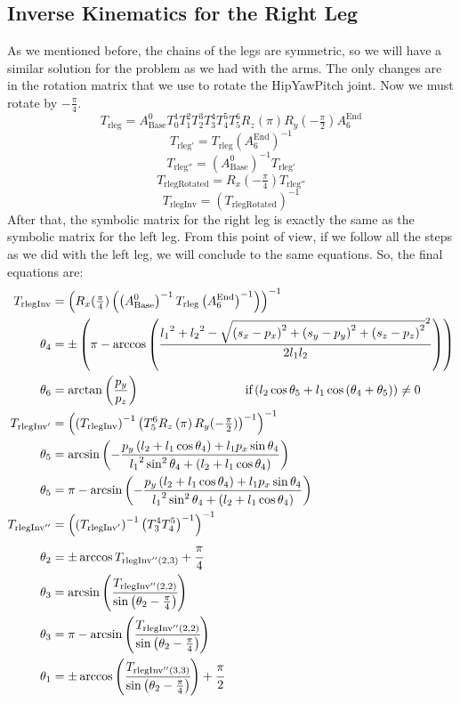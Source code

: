 \subsection{Inverse Kinematics for the Right Leg}
As we mentioned before, the chains of the legs are symmetric, so we will have a similar solution for the problem as we had with the arms. The only changes are in the rotation matrix that we use to rotate the HipYawPitch joint. Now we must rotate by $-\frac{\pi}{4}$.
\[
T_{\text{rleg}} = A^0_\text{Base}T^1_0T^2_1T^3_2T^4_3T^5_4T^6_5R_z(\pi)R_y(-\tfrac{\pi}{2})A^\text{End}_6
\]
\[
T_{\text{rleg}'} = T_\text{rleg}{\left(A^\text{End}_6\right)}^{-1}
\]
\[
T_{\text{rleg}''} = {\left(A^0_\text{Base}\right)}^{-1}T_{\text{rleg}'}
\]
\[
T_\text{rlegRotated} = R_x(-\tfrac{\pi}{4}) T_{\text{rleg}''}
\]
\[
T_\text{rlegInv} = {\left(T_\text{rlegRotated}\right)}^{-1}
\]
After that, the symbolic matrix for the right leg is exactly the same as the symbolic matrix for the left leg. From this point of view, if we follow all the steps as we did with the left leg, we will conclude to the same equations. So, the final equations are:
\begin{align*}
T_\text{rlegInv} &= \left(R_x(\tfrac{\pi}{4})\left(\left(A^0_\text{Base}\right)^{-1} T_\text{rleg} \left(A^\text{End}_6\right)^{-1}\right)\right)^{-1} \\
\theta_4 &=\pm\left(\pi - \arccos\left(\frac{{l_1}^2 + {l_2}^2 - \sqrt{\left(s_x-p_x\right)^2 + \left(s_y-p_y\right)^2 + \left(s_z-p_z\right)^2}^2}{2 l_1 l_2}\right)\right) \\
\theta_6 &= \arctan\left(\frac{p_y}{p_z}\right)\hspace{3cm}\text{if} \left(l_2\cos\theta_5 + l_1 \cos\left(\theta_4 + \theta_5\right)\right) \neq 0 \\
T_{\text{rlegInv}'} &= \left(\left(T_\text{rlegInv}\right)^{-1}\left(T^6_5R_z\left(\pi\right)R_y(-\tfrac{\pi}{2})\right)^{-1}\right)^{-1} \\
\theta_5 &= \arcsin\left(-\frac{p_y\left(l_2+l_1\cos\theta_4\right) + l_1p_x\sin\theta_4}{{l_1}^2\sin^2\theta_4 + \left(l_2 + l_1\cos\theta_4\right)}\right) \\
\theta_5 &= \pi - \arcsin\left(-\frac{p_y\left(l_2+l_1\cos\theta_4\right) + l_1p_x\sin\theta_4}{{l_1}^2\sin^2\theta_4 + \left(l_2 + l_1\cos\theta_4\right)}\right)\\
T_{\text{rlegInv}''} &= \left(\left(T_{\text{rlegInv}'}\right)^{-1}\left(T^4_3T^5_4\right)^{-1}\right)^{-1} \\
\theta_2 &= \pm\arccos T_{\text{rlegInv}''(2,3)} + \cfrac{\pi}{4} \\
\theta_3 &= \arcsin\left(\cfrac{T_{\text{rlegInv}''(2,2)}}{\sin\left(\theta_2 - \frac{\pi}{4}\right)}\right) \\
\theta_3 &= \pi - \arcsin\left(\cfrac{T_{\text{rlegInv}''(2,2)}}{\sin\left(\theta_2 - \frac{\pi}{4}\right)}\right) \\
\theta_1 &= \pm\arccos\left(\cfrac{T_{\text{rlegInv}''(3,3)}}{\sin\left(\theta_2 - \frac{\pi}{4}\right)}\right) + \cfrac{\pi}{2}
\end{align*}








